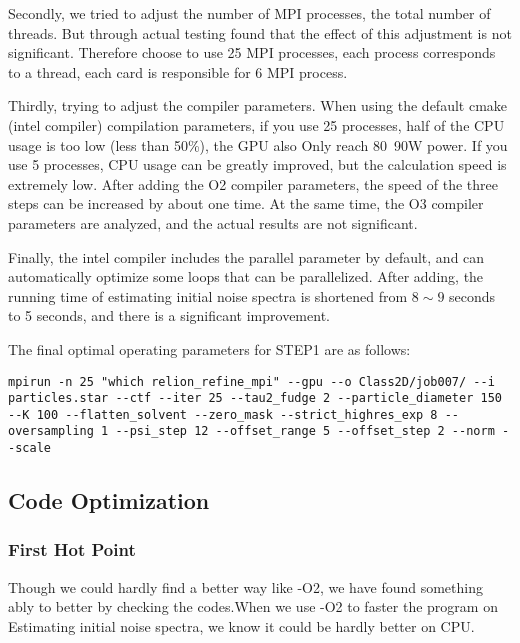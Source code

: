 \documentclass{mcmthesis}
\begin{document}
\par Secondly, we tried to adjust the number of MPI processes, the total number of threads. But through actual testing found that the effect of this adjustment is not significant. Therefore choose to use 25 MPI processes, each process corresponds to a thread, each card is responsible for 6 MPI process.

\par Thirdly, trying to adjust the compiler parameters. When using the default cmake (intel compiler) compilation parameters, if you use 25 processes, half of the CPU usage is too low (less than 50\%), the GPU also Only reach 80~90W power. If you use 5 processes, CPU usage can be greatly improved, but the calculation speed is extremely low. After adding the O2 compiler parameters, the speed of the three steps can be increased by about one time. At the same time, the O3 compiler parameters are analyzed, and the actual results are not significant.

\par Finally, the intel compiler includes the parallel parameter by default, and can automatically optimize some loops that can be parallelized. After adding, the running time of estimating initial noise spectra is shortened from $8 \sim 9$ seconds to 5 seconds, and there is a significant improvement.

\par The final optimal operating parameters for STEP1 are as follows:

\begin{lstlisting}
mpirun -n 25 "which relion_refine_mpi" --gpu --o Class2D/job007/ --i particles.star --ctf --iter 25 --tau2_fudge 2 --particle_diameter 150 --K 100 --flatten_solvent --zero_mask --strict_highres_exp 8 --oversampling 1 --psi_step 12 --offset_range 5 --offset_step 2 --norm --scale
\end{lstlisting}

\subsection{Code Optimization}

\subsubsection{First Hot Point}

\par Though we could hardly find a better way like -O2, we have found something ably to better by checking the codes.When we use -O2 to faster the program on Estimating initial noise spectra, we know it could be hardly better on CPU.
\end{document}

